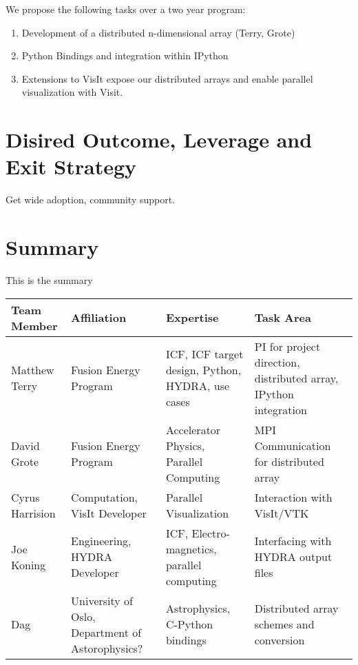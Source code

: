 \documentclass[a4paper]{article}
\newlength{\DUtablewidth} %
\begin{document}
We propose the following tasks over a two year program:

\begin{enumerate}
	\item Development of a distributed n-dimensional array (Terry, Grote)

	\item Python Bindings and integration within IPython

	\item Extensions to VisIt expose our distributed arrays and enable parallel visualization with Visit.
\end{enumerate}


\section*{Disired Outcome, Leverage and Exit Strategy}
Get wide adoption, community support.


\section*{Summary}

This is the summary


\setlength{\DUtablewidth}{\linewidth}
\begin{longtable*}[c]{|p{0.187\DUtablewidth}|p{0.251\DUtablewidth}|p{0.260\DUtablewidth}|p{0.251\DUtablewidth}|}
	\hline
	\textbf{Team Member} & \textbf{Affiliation} & \textbf{Expertise} & \textbf{Task Area} \\
	\hline
	\endfirsthead
	\hline

	Matthew Terry &
	Fusion Energy Program &
	ICF, ICF target design, Python, HYDRA, use cases &
	PI for project direction, distributed array, IPython integration \\
	\hline

	David Grote &
	Fusion Energy Program &
	Accelerator Physics, Parallel Computing &
	MPI Communication for distributed array \\
	\hline

	Cyrus Harrision &
	Computation, VisIt Developer &
	Parallel Visualization &
	Interaction with VisIt/VTK  \\
	\hline

	Joe Koning &
	Engineering, HYDRA Developer & 
	ICF, Electro-magnetics, parallel computing & 
	Interfacing with HYDRA output files \\
	\hline

	Dag & 
	University of Oslo, Department of Astorophysics? & 
	Astrophysics, C-Python bindings &
	Distributed array schemes and conversion \\
	\hline
\end{longtable*}



\end{document}

